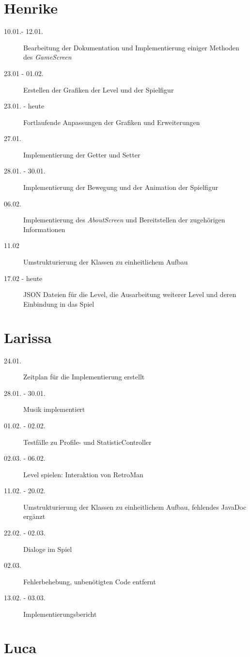 \documentclass[parskip=full]{scrreprt}
\begin{document}
\section{Henrike}
\begin{description}
	\item[10.01.- 12.01.]
	Bearbeitung der Dokumentation und Implementierung einiger Methoden des \emph{GameScreen}
	\item[23.01 - 01.02.]
	Erstellen der Grafiken der Level und der Spielfigur
	\item[23.01. - heute]
	Fortlaufende Anpassungen der Grafiken und Erweiterungen
	\item[27.01.]
	Implementierung der Getter und Setter
	\item[28.01. - 30.01.]
	Implementierung der Bewegung und der Animation der Spielfigur
	\item[06.02.]
	Implementierung des \emph{AboutScreen} und Bereitstellen der zugehörigen Informationen
	\item[11.02]
	Umstrukturierung der Klassen zu einheitlichem Aufbau
	\item[17.02 - heute]
	JSON Dateien für die Level, die Ausarbeitung weiterer Level und deren Einbindung in das Spiel 
\end{description}

\section{Larissa}
\begin{description}
\item[24.01.] 
Zeitplan für die Implementierung erstellt
\item[28.01. - 30.01.] 
Musik implementiert
\item[01.02. - 02.02.] 
Testfälle zu Profile- und StatisticController
\item[02.03. - 06.02.] 
Level spielen: Interaktion von RetroMan
\item[11.02. - 20.02.]
Umstrukturierung der Klassen zu einheitlichem Aufbau, fehlendes JavaDoc ergänzt
\item[22.02. - 02.03.] 
Dialoge im Spiel
\item[02.03.] 
Fehlerbehebung, unbenötigten Code entfernt
\item[13.02. - 03.03.] 
Implementierungsbericht
\end{description}

\section{Luca}
\end{document}
